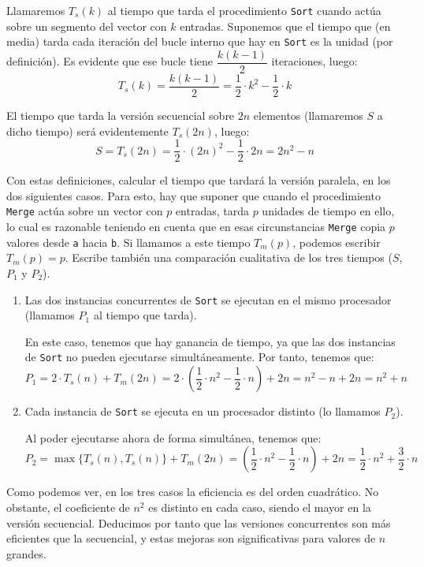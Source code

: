 \begin{ejercicio}
    Llamaremos $T_s(k)$ al tiempo que tarda el procedimiento \verb|Sort| cuando actúa sobre un segmento del vector con $k$ entradas. Suponemos que el tiempo que (en media) tarda cada iteración del bucle interno que hay en \verb|Sort| es la unidad (por definición). Es evidente que ese bucle tiene $\dfrac{k(k-1)}{2}$ iteraciones, luego:
    \[
        T_s(k) = \dfrac{k(k-1)}{2} = \dfrac{1}{2}\cdot k^2 - \dfrac{1}{2}\cdot k
    \]

    El tiempo que tarda la versión secuencial sobre $2n$ elementos (llamaremos $S$ a dicho tiempo) será evidentemente $T_s(2n)$, luego:
    \[
        S = T_s(2n) = \dfrac{1}{2}\cdot (2n)^2 - \dfrac{1}{2}\cdot 2n = 2n^2 - n
    \]

    Con estas definiciones, calcular el tiempo que tardará la versión paralela, en los dos siguientes casos. Para esto, hay que suponer que cuando el procedimiento \verb|Merge| actúa sobre un vector con $p$ entradas, tarda $p$ unidades de tiempo en ello, lo cual es razonable teniendo en cuenta que en esas circunstancias \verb|Merge| copia $p$ valores desde \verb|a| hacia \verb|b|. Si llamamos a este tiempo $T_m(p)$, podemos escribir $T_m(p) = p$. Escribe también una comparación cualitativa de los tres tiempos ($S$, $P_1$ y $P_2$). 
    \begin{enumerate}
        \item Las dos instancias concurrentes de \verb|Sort| se ejecutan en el mismo procesador (llamamos $P_1$ al tiempo que tarda).
        
        En este caso, tenemos que hay ganancia de tiempo, ya que las dos instancias de \verb|Sort| no pueden ejecutarse simultáneamente. Por tanto, tenemos que:
        \begin{equation*}
            P_1 = 2\cdot T_s(n) + T_m(2n) = 2\cdot \left( \dfrac{1}{2}\cdot n^2 - \dfrac{1}{2}\cdot n \right) + 2n = n^2 - n + 2n = n^2 + n
        \end{equation*}
        \item Cada instancia de \verb|Sort| se ejecuta en un procesador distinto (lo llamamos $P_2$).
        
        Al poder ejecutarse ahora de forma simultánea, tenemos que:
        \begin{equation*}
            P_2 = \max\{ T_s(n), T_s(n) \} + T_m(2n) = \left( \dfrac{1}{2}\cdot n^2 - \dfrac{1}{2}\cdot n \right) + 2n = \dfrac{1}{2}\cdot n^2 + \dfrac{3}{2}\cdot n
        \end{equation*}
    \end{enumerate}

    Como podemos ver, en los tres casos la eficiencia es del orden cuadrático. No obstante,
    el coeficiente de $n^2$ es distinto en cada caso, siendo el mayor en la versión secuencial. Deducimos por tanto que las versiones concurrentes son más eficientes que la secuencial, y estas mejoras son significativas para valores de $n$ grandes.    

\end{ejercicio}


